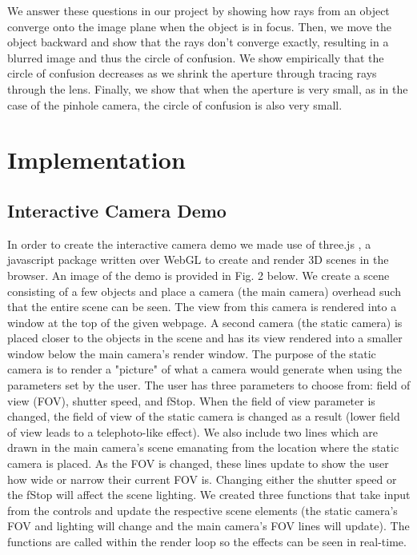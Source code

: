 \documentclass{acm_proc_article-sp}
\begin{document}
We answer these questions in our project by showing how rays from an object
converge onto the image plane when the object is in focus. Then, we move the
object backward and show that the rays don't converge exactly, resulting in a
blurred image and thus the circle of confusion. We show empirically that the
circle of confusion decreases as we shrink the aperture through tracing rays
through the lens. Finally, we show that when the aperture is very small, as in
the case of the pinhole camera, the circle of confusion is also very small.

\section{Implementation}
\smallskip
\subsection{Interactive Camera Demo}
In order to create the interactive camera demo we made use of three.js
\cite{threejs}, a javascript package written over WebGL to create and render 3D
scenes in the browser. An image of the demo is provided in Fig. 2 below. We
create a scene consisting of a few objects and place a camera (the main camera)
overhead such that the entire scene can be seen. The view from this camera is
rendered into a window at the top of the given webpage. A second camera (the
static camera) is placed closer to the objects in the scene and has its view
rendered into a smaller window below the main camera's render window. The
purpose of the static camera is to render a "picture" of what a camera would
generate when using the parameters set by the user. The user has three
parameters to choose from: field of view (FOV), shutter speed, and fStop. When
the field of view parameter is changed, the field of view of the static camera
is changed as a result (lower field of view leads to a telephoto-like effect).
We also include two lines which are drawn in the main camera's scene emanating
from the location where the static camera is placed. As the FOV is changed,
these lines update to show the user how wide or narrow their current FOV is.
Changing either the shutter speed or the fStop will affect the scene lighting.
We created three functions that take input from the controls and update the
respective scene elements (the static camera's FOV and lighting will change and
the main camera's FOV lines will update). The functions are called within the
render loop so the effects can be seen in real-time.
\end{document}
